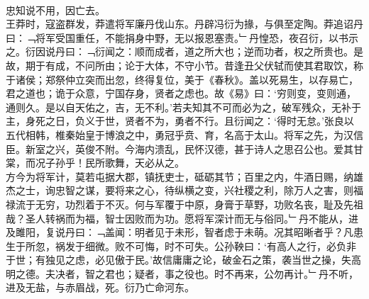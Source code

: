 \\
忠知说不用，因亡去。
\\
王莽时，寇盗群发，莽遣将军廉丹伐山东。丹辟冯衍为掾，与俱至定陶。莽追诏丹曰：﹁将军受国重任，不能捐身中野，无以报恩塞责。﹂丹惶恐，夜召衍，以书示之。衍因说丹曰：﹁衍闻之：顺而成者，道之所大也；逆而功者，权之所贵也。是故，期于有成，不问所由；论于大体，不守小节。昔逢丑父伏轼而使其君取饮，称于诸侯；郑祭仲立突而出忽，终得复位，美于《春秋》。盖以死易生，以存易亡，君之道也；诡于众意，宁国存身，贤者之虑也。故《易》曰：‘穷则变，变则通，通则久。是以自天佑之，吉，无不利。’若夫知其不可而必为之，破军残众，无补于主，身死之日，负义于世，贤者不为，勇者不行。且衍闻之：‘得时无怠。’张良以五代相韩，椎秦始皇于博浪之中，勇冠乎贲、育，名高于太山。将军之先，为汉信臣。新室之兴，英俊不附。今海内溃乱，民怀汉德，甚于诗人之思召公也。爱其甘棠，而况子孙乎！民所歌舞，天必从之。\\
方今为将军计，莫若屯据大郡，镇抚吏士，砥砺其节；百里之内，牛酒日赐，纳雄杰之士，询忠智之谋，要将来之心，待纵横之变，兴社稷之利，除万人之害，则福禄流于无穷，功烈着于不灭。何与军覆于中原，身膏于草野，功败名丧，耻及先祖哉？圣人转祸而为福，智士因败而为功。愿将军深计而无与俗同。﹂丹不能从，进及雎阳，复说丹曰：﹁盖闻：明者见于未形，智者虑于未萌。况其昭晰者乎？凡患生于所忽，祸发于细微。败不可悔，时不可失。公孙鞅曰：‘有高人之行，必负非于世；有独见之虑，必见傲于民。’故信庸庸之论，破金石之策，袭当世之操，失高明之德。夫决者，智之君也；疑者，事之役也。时不再来，公勿再计。﹂丹不听，进及无盐，与赤眉战，死。衍乃亡命河东。
\\
